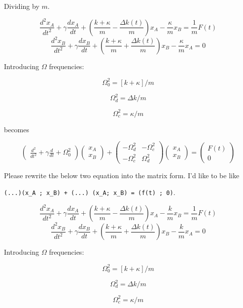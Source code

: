 Dividing by $m$.

\[
  \frac{d^2x_A}{dt^2} + \gamma \frac{dx_A}{dt} + \left(\frac{k + \kappa}{m} - \frac{\Delta
    k(t)}{m}\right)x_A -\frac{\kappa}{m}x_B = \frac{1}{m}F(t)
\]
\[
  \frac{d^2x_B}{dt^2} + \gamma \frac{dx_B}{dt} + \left(\frac{k + \kappa}{m} + \frac{\Delta
    k(t)}{m}\right)x_B -\frac{\kappa}{m}x_A = 0
\]

Introducing $\Omega$ frequencies:

\[
  \Omega_0^2 = [k + \kappa]/m
\]

\[
  \Omega_d^2 = \Delta k / m
\]

\[
  \Omega_c^2 = \kappa / m
\]

becomes

\[
\begin{pmatrix}
  \frac{d^2}{dt^2} + \gamma \frac{d}{dt} + \Omega_0^2
\end{pmatrix}
\begin{pmatrix}
 x_A \\
 x_B
\end{pmatrix}
+
\begin{pmatrix}
  -\Omega_d^2 & -\Omega_c^2 \\ -\Omega_c^2 & \Omega_d^2
\end{pmatrix}
\begin{pmatrix}
 x_A \\
 x_B
\end{pmatrix}
=
\begin{pmatrix}
 F(t) \\
 0
\end{pmatrix}
\]


\begin{ai}
Please rewrite the below two equation into the matrix form. I'd like to be like

\vsp

\verb|(...)(x_A ; x_B) + (...) (x_A; x_B) = (f(t) ; 0)|.

\[
  \frac{d^2x_A}{dt^2} + \gamma \frac{dx_A}{dt} + \left(\frac{k + \kappa}{m} - \frac{\Delta
    k(t)}{m}\right)x_A -\frac{k}{m}x_B = \frac{1}{m}F(t)
\]
\[
  \frac{d^2x_B}{dt^2} + \gamma \frac{dx_B}{dt} + \left(\frac{k + \kappa}{m} + \frac{\Delta
    k(t)}{m}\right)x_B -\frac{k}{m}x_A = 0
\]

Introducing $\Omega$ frequencies:

\[
  \Omega_0^2 = [k + \kappa]/m
\]

\[
  \Omega_d^2 = \Delta k / m
\]

\[
  \Omega_c^2 = \kappa / m
\]


\end{ai}

